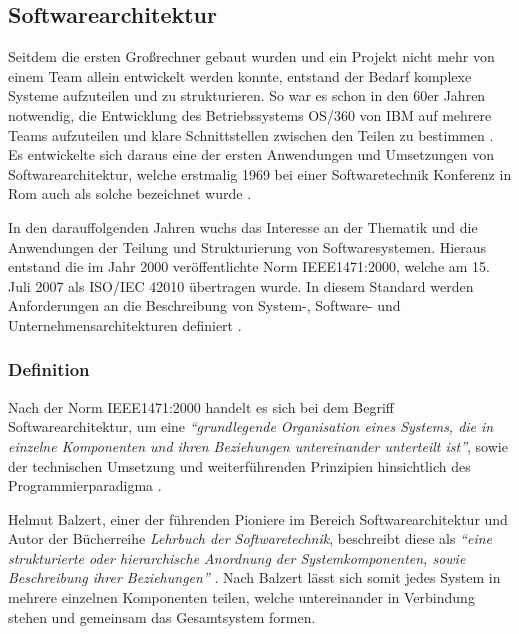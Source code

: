 \subsection{Softwarearchitektur}

Seitdem die ersten Großrechner gebaut wurden und ein Projekt nicht mehr von einem Team allein entwickelt werden konnte, entstand der Bedarf komplexe Systeme aufzuteilen und zu strukturieren. So war es schon in den 60er Jahren notwendig, die Entwicklung des Betriebssystems OS/360 von IBM auf mehrere Teams aufzuteilen und klare Schnittstellen zwischen den Teilen zu bestimmen \parencite{brooks_mythical_1995}. Es entwickelte sich daraus eine der ersten Anwendungen und Umsetzungen von Softwarearchitektur, welche erstmalig 1969 bei einer Softwaretechnik Konferenz in Rom auch als solche bezeichnet wurde \parencite[vgl.][S. 12]{buxton_software_1970}.

In den darauffolgenden Jahren wuchs das Interesse an der Thematik und die Anwendungen der Teilung und Strukturierung von Softwaresystemen. Hieraus entstand die im Jahr 2000 veröffentlichte Norm IEEE1471:2000, welche am 15. Juli 2007 als ISO/IEC 42010 übertragen wurde. In diesem Standard werden Anforderungen an die Beschreibung von System-, Software- und Unternehmensarchitekturen definiert \parencite{hilliard_isoiecieee_nodate}.

\subsubsection{Definition}
\label{sec:software-architect-definition}

Nach der Norm IEEE1471:2000 handelt es sich bei dem Begriff Softwarearchitektur, um eine  \textit{\enquote{grundlegende Organisation eines Systems, die in einzelne Komponenten und ihren Beziehungen untereinander unterteilt ist}}, sowie der technischen Umsetzung und weiterführenden Prinzipien hinsichtlich des Programmierparadigma \parencite[S. 12]{clements_comparing_2005}.

Helmut Balzert, einer der führenden Pioniere im Bereich Softwarearchitektur und Autor der Bücherreihe \textit{Lehrbuch der Softwaretechnik}, beschreibt diese als \textit{\enquote{eine strukturierte oder hierarchische Anordnung der Systemkomponenten, sowie Beschreibung ihrer Beziehungen}} \parencite[][S. 580]{balzert_lehrbuch_2011}. Nach Balzert lässt sich somit jedes System in mehrere einzelnen Komponenten teilen, welche untereinander in Verbindung stehen und gemeinsam das Gesamtsystem formen.


